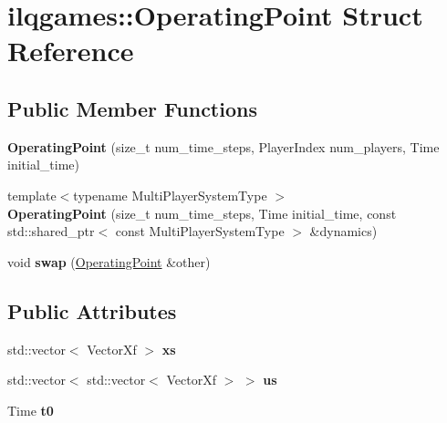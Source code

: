 \hypertarget{structilqgames_1_1_operating_point}{}\section{ilqgames\+:\+:Operating\+Point Struct Reference}
\label{structilqgames_1_1_operating_point}
\subsection*{Public Member Functions}
\begin{DoxyCompactItemize}
\item 
{\bfseries Operating\+Point} (size\+\_\+t num\+\_\+time\+\_\+steps, Player\+Index num\+\_\+players, Time initial\+\_\+time)\hypertarget{structilqgames_1_1_operating_point_a28dab0579fa6ece2f983c8eec32d6819}{}\label{structilqgames_1_1_operating_point_a28dab0579fa6ece2f983c8eec32d6819}

\item 
{\footnotesize template$<$typename Multi\+Player\+System\+Type $>$ }\\{\bfseries Operating\+Point} (size\+\_\+t num\+\_\+time\+\_\+steps, Time initial\+\_\+time, const std\+::shared\+\_\+ptr$<$ const Multi\+Player\+System\+Type $>$ \&dynamics)\hypertarget{structilqgames_1_1_operating_point_a2f0f88591999c3b214f1a552b5b352a5}{}\label{structilqgames_1_1_operating_point_a2f0f88591999c3b214f1a552b5b352a5}

\item 
void {\bfseries swap} (\hyperlink{structilqgames_1_1_operating_point}{Operating\+Point} \&other)\hypertarget{structilqgames_1_1_operating_point_a373b480b0f424863bb2dfaced7cd2f6f}{}\label{structilqgames_1_1_operating_point_a373b480b0f424863bb2dfaced7cd2f6f}

\end{DoxyCompactItemize}
\subsection*{Public Attributes}
\begin{DoxyCompactItemize}
\item 
std\+::vector$<$ Vector\+Xf $>$ {\bfseries xs}\hypertarget{structilqgames_1_1_operating_point_a8d92a8f89457d4498cf0084e6752570d}{}\label{structilqgames_1_1_operating_point_a8d92a8f89457d4498cf0084e6752570d}

\item 
std\+::vector$<$ std\+::vector$<$ Vector\+Xf $>$ $>$ {\bfseries us}\hypertarget{structilqgames_1_1_operating_point_a69c62d532a1ab13a70e5dc40aede8a6a}{}\label{structilqgames_1_1_operating_point_a69c62d532a1ab13a70e5dc40aede8a6a}

\item 
Time {\bfseries t0}\hypertarget{structilqgames_1_1_operating_point_a04e5e484159428a29d8aa71cb83e5542}{}\label{structilqgames_1_1_operating_point_a04e5e484159428a29d8aa71cb83e5542}

\end{DoxyCompactItemize}


